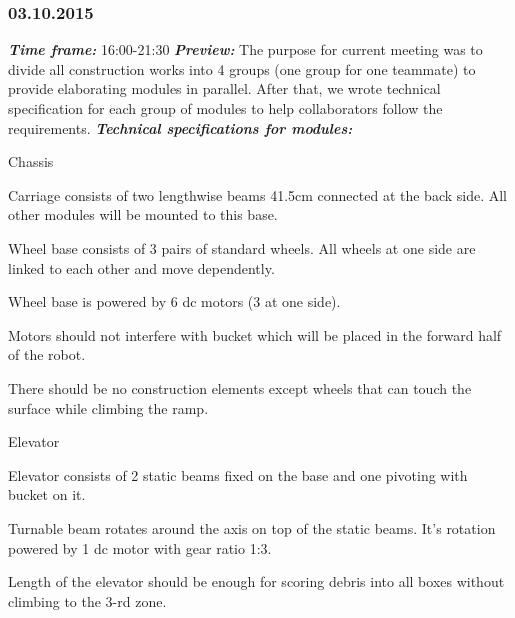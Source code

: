\subsubsection{03.10.2015}
	\textit{\textbf{Time frame:}} 16:00-21:30 \newline
	\textit{\textbf{Preview:}} The purpose for current meeting was to divide all construction works into 4 groups (one group for one teammate) to provide elaborating modules in parallel. After that, we wrote technical specification for each group of modules to help collaborators follow the requirements. \newline \newline
	\textit{\textbf{Technical specifications for modules:}}
  \begin{enumerate*}
  	\item Chassis
  	\begin{enumerate*}
  		\item Carriage consists of two lengthwise beams 41.5cm connected at the back side. All other modules will be mounted to this base. 
  		
  		\item Wheel base consists of 3 pairs of standard wheels. All wheels at one side are linked to each other and move dependently.
  		
  		\item Wheel base is powered by 6 dc motors (3 at one side). 
  		
  		\item Motors should not interfere with bucket which will be placed in the forward half of the robot. 
  		
  		\item There should be no construction elements except wheels that can touch the surface while climbing the ramp. 
  		
  	\end{enumerate*}
  	
  	\item Elevator
  	\begin{enumerate*}
  		\item Elevator consists of 2 static beams fixed on the base and one pivoting with bucket on it.
  		
  		\item Turnable beam rotates around the axis on top of the static beams. It's rotation powered by 1 dc motor with gear ratio 1:3.
  		
  		\item Length of the elevator should be enough for scoring debris into all boxes without climbing to the 3-rd zone.
  	\end{enumerate*}
  	

\end{enumerate*}
